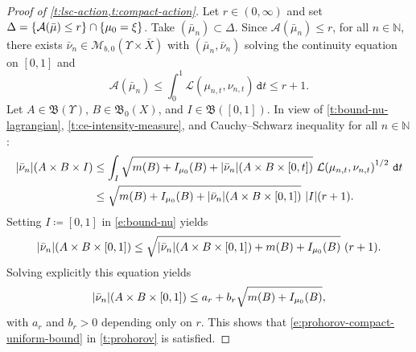 \documentclass[10pt]{amsart}
\theoremstyle{definition}
\theoremstyle{remark}
\DeclarePairedDelimiter{\set}{\lbrace}{\rbrace}
\DeclarePairedDelimiter{\abs}{\lvert}{\rvert}
\begin{document}
\begin{proof}[Proof of {\cref{t:lsc-action,t:compact-action}}]
Let $r \in (0,\infty)$ and set $\Delta = \set{ \mathcal{A}(\bar{\mu}) \leq r } \cap \set{ \mu_{0} = \xi }$.
Take $(\bar{\mu}_{n}) \subset \Delta$.
Since $\mathcal{A}(\bar{\mu}_{n}) \leq r$, for all $n \in \mathbb{N}$, there exists $\bar{\nu}_{n} \in \mathscr{M}_{b,0}(\varUpsilon \times \bar{X})$ with $(\bar{\mu}_{n}, \bar{\nu}_{n})$ solving the continuity equation on $[0,1]$ and
\begin{equation*}
\mathcal{A}(\bar{\mu}_{n}) \le \int_{0}^{1} \mathcal{L}(\mu_{n,t}, \nu_{n,t})\, \mathtt{d} t \leq r + 1.
\end{equation*}
Let $A \in \mathfrak{B}(\varUpsilon)$, $B \in \mathfrak{B}_{0}(X)$, and $I \in \mathfrak{B}([0,1])$.
In view of \cref{t:bound-nu-lagrangian}, \cref{t:ce-intensity-measure}, and Cauchy--Schwarz inequality for all $n \in \mathbb{N}$:
\begin{equation}\label{e:bound-nu}
\begin{split}
\abs{\bar{\nu}_{n}}(A \times B \times I) & \leq \int_{I} \sqrt{m(B) + I_{\mu_{0}}(B) + \abs{\bar{\nu}_{n}}(A \times B \times [0,t])} \ {\mathcal{L}(\mu_{n,t}, \nu_{n,t})}^{1/2} \ \mathtt{d} t \\
& \leq \sqrt{m(B) + I_{\mu_{0}}(B) + \abs{\bar{\nu}_{n}}(A \times B \times [0,1])} \ \abs[big]{I} (r+1).
\end{split}
\end{equation}
Setting $I \coloneq [0,1]$ in \cref{e:bound-nu} yields
\begin{equation*}
\abs{\bar{\nu}_{n}}(A \times B \times [0,1]) \leq \sqrt{\abs{\bar{\nu}_{n}}(A \times B \times [0,1]) + m(B) + I_{\mu_{0}}(B)} \ (r+1).
\end{equation*}
Solving explicitly this equation yields
\begin{equation}\label{e:bound-nu-total-mass}
\abs{\bar{\nu}_{n}}(A \times B \times [0,1]) \leq a_{r} + b_{r} \sqrt{m(B) + I_{\mu_{0}}(B)},
\end{equation}
with $a_{r}$ and $b_{r} > 0$ depending only on $r$.
This shows that \cref{e:prohorov-compact-uniform-bound} in \cref{t:prohorov} is satisfied.


\end{proof}
\end{document}
